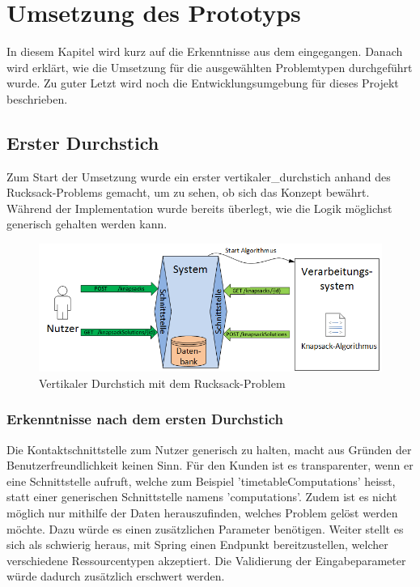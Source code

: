 %
%

\chapter{Umsetzung des Prototyps \resultAssignment{[R5]}}\label{chap.umsetzung}
In diesem Kapitel wird kurz auf die Erkenntnisse aus dem  eingegangen. Danach wird erklärt, wie die Umsetzung für die ausgewählten 
Problemtypen durchgeführt wurde. Zu guter Letzt wird noch die Entwicklungsumgebung für dieses Projekt beschrieben.

\section{Erster Durchstich}\label{entwicklungsumgebung}
Zum Start der Umsetzung wurde ein erster \gls{vertikaler_durchstich} anhand des Rucksack-Problems gemacht, um zu sehen, ob sich das Konzept bewährt. Während der 
Implementation wurde bereits überlegt, wie die Logik möglichst generisch gehalten werden kann.

\begin{figure}[h]
\centering
\includegraphics[scale=0.74]{images/visio/prototype_knapsack.png}
\caption[\Gls{vertikaler_durchstich} mit dem Rucksack-Problem]{Vertikaler Durchstich mit dem Rucksack-Problem \selfmade{}}
\label{fig:prototyp_knapsack}
\end{figure}

\subsection{Erkenntnisse nach dem ersten Durchstich}\label{learning_prototyp}
Die Kontaktschnittstelle zum Nutzer generisch zu halten, macht aus Gründen der Benutzerfreundlichkeit keinen Sinn. Für den Kunden ist es transparenter, wenn er eine Schnittstelle aufruft, 
welche zum Beispiel 'timetableComputations' heisst, statt einer generischen Schnittstelle namens 'computations'. Zudem ist es nicht möglich nur mithilfe der Daten herauszufinden, welches 
Problem gelöst werden möchte. Dazu würde es einen zusätzlichen Parameter benötigen. Weiter stellt es sich als schwierig heraus, mit Spring einen Endpunkt bereitzustellen, welcher 
verschiedene Ressourcentypen akzeptiert. Die Validierung der Eingabeparameter würde dadurch zusätzlich erschwert werden.

